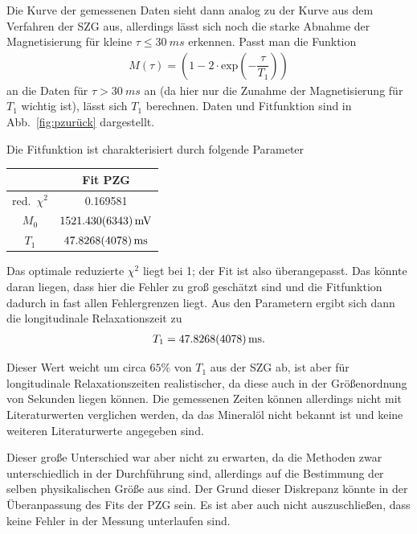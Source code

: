 \documentclass[10pt]{article}
\newenvironment{Figure}
  {\par\medskip\noindent\minipage{\linewidth}}
  {\endminipage\par\medskip}
\begin{document}
\begin{multicols}{2}
Die Kurve der gemessenen Daten sieht dann analog zu der Kurve aus dem Verfahren der SZG aus, allerdings lässt sich noch die starke Abnahme der Magnetisierung für kleine $\tau \leq \SI{30}{ms}$ erkennen.
Passt man die Funktion
\begin{align} 
        M\left(\tau \right)=\left(1-2\cdot \text{exp}\left(-\dfrac{\tau }{T_1}\right)\right)
\end{align} 
an die Daten für $\tau >\SI{30}{ms}$ an (da hier nur die Zunahme der Magnetisierung für $T_1$ wichtig ist), lässt sich $T_1$ berechnen.
Daten und Fitfunktion sind in Abb.\ \ref{fig:pzurück} dargestellt.
  \begin{Figure}
    \centering\resizebox{\textwidth}{!}{}
    \label{fig:pzurück}
  \end{Figure}
Die Fitfunktion ist charakterisiert durch folgende Parameter
  \begin{center}
    \begin{tabular}{c|c}
    & Fit PZG\\
    \hline
    red.\ $\chi^2$ & 0.169581\\
    $M_0$ & $\SI{1521.43+-6.343}{mV}$ \\
    $T_1$ & $\SI{47.8268+-0.4078}{ms}$ 
    \end{tabular}
  \label{Tab:PZG_para}
  \end{center}
Das optimale reduzierte $\chi ^2$ liegt bei 1; der Fit ist also überangepasst.
Das könnte daran liegen, dass hier die Fehler zu groß geschätzt sind und die Fitfunktion dadurch in fast allen Fehlergrenzen liegt.
Aus den Parametern ergibt sich dann die longitudinale Relaxationszeit zu
\begin{align} 
        T_1=\SI{47.8268+-0.4078}{ms}
.\end{align} 

Dieser Wert weicht um circa $65\%$ von $T_1$ aus der SZG ab, ist aber für longitudinale Relaxationszeiten realistischer, da diese auch in der Größenordnung von Sekunden liegen können.
Die gemessenen Zeiten können allerdings nicht mit Literaturwerten verglichen werden, da das Mineralöl nicht bekannt ist und keine weiteren Literaturwerte angegeben sind.

Dieser große Unterschied war aber nicht zu erwarten, da die Methoden zwar unterschiedlich in der Durchführung sind, allerdings auf die Bestimmung der selben physikalischen Größe aus sind.
Der Grund dieser Diskrepanz könnte in der Überanpassung des Fits der PZG sein.
Es ist aber auch nicht auszuschließen, dass keine Fehler in der Messung unterlaufen sind.


\end{multicols}
\end{document}
